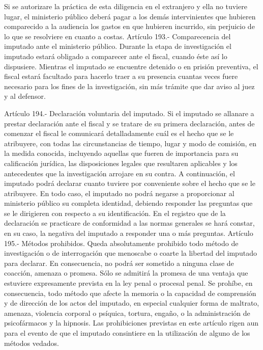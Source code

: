     Si se autorizare la práctica de esta diligencia en el extranjero y ella no tuviere lugar, el ministerio público deberá pagar a los demás intervinientes que hubieren comparecido a la audiencia los gastos en que hubieren incurrido, sin perjuicio de lo que se resolviere en cuanto a costas.
    Artículo 193.- Comparecencia del imputado ante el ministerio público. Durante la etapa de investigación el imputado estará obligado a comparecer ante el fiscal, cuando éste así lo dispusiere.
    Mientras el imputado se encuentre detenido o en prisión preventiva, el fiscal estará facultado para hacerlo traer a su presencia cuantas veces fuere necesario para los fines de la investigación, sin más trámite que dar aviso al juez y al defensor.



    Artículo 194.- Declaración voluntaria del imputado. Si el imputado se allanare a prestar declaración ante el fiscal y se tratare de su primera declaración, antes de comenzar el fiscal le comunicará detalladamente cuál es el hecho que se le atribuyere, con todas las circunstancias de tiempo, lugar y modo de comisión, en la medida conocida, incluyendo aquellas que fueren de importancia para su calificación jurídica, las disposiciones legales que resultaren aplicables y los antecedentes que la investigación arrojare en su contra. A continuación, el imputado podrá declarar cuanto tuviere por conveniente sobre el hecho que se le atribuyere.
    En todo caso, el imputado no podrá negarse a proporcionar al ministerio público su completa identidad, debiendo responder las preguntas que se le dirigieren con respecto a su identificación.
    En el registro que de la declaración se practicare de conformidad a las normas generales se hará constar, en su caso, la negativa del imputado a responder una o más preguntas.
    Artículo 195.- Métodos prohibidos. Queda absolutamente prohibido todo método de investigación o de interrogación que menoscabe o coarte la libertad del imputado para declarar. En consecuencia, no podrá ser sometido a ninguna clase de coacción, amenaza o promesa.
Sólo se admitirá la promesa de una ventaja que estuviere expresamente prevista en la ley penal o procesal penal.
    Se prohíbe, en consecuencia, todo método que afecte la memoria o la capacidad de comprensión y de dirección de los actos del imputado, en especial cualquier forma de maltrato, amenaza, violencia corporal o psíquica, tortura, engaño, o la administración de psicofármacos y la hipnosis.
    Las prohibiciones previstas en este artículo rigen aun para el evento de que el imputado consintiere en la utilización de alguno de los métodos vedados.
